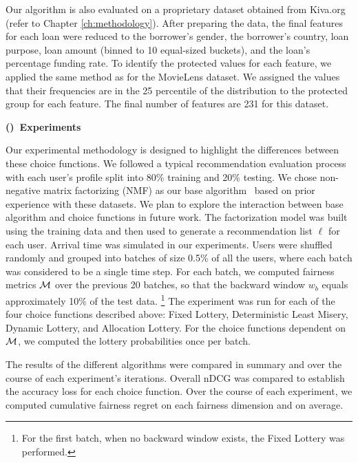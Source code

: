 Our algorithm is also evaluated on a proprietary dataset obtained from Kiva.org (refer to Chapter \ref{ch:methodology}). After preparing the data, the final features for each loan were reduced to the borrower's gender, the borrower's country, loan purpose, loan amount (binned to 10 equal-sized buckets), and the loan's percentage funding rate. To identify the protected values for each feature, we applied the same method as for the MovieLens dataset. We assigned the values that their frequencies are in the 25 percentile of the distribution to the protected group for each feature. The final number of features are 231 for this dataset.

\vspace{0.25cm}
\noindent \textbf{()~Experiments}
\vspace{0.25cm}

Our experimental methodology is designed to highlight the differences between these choice functions. We followed a typical recommendation evaluation process with each user's profile split into 80\% training and 20\% testing. We chose non-negative matrix factorizing (NMF) as our base algorithm~\cite{takacs2008investigation} based on prior experience with these datasets. We plan to explore the interaction between base algorithm and choice functions in future work. The factorization model was built using the training data and then used to generate a recommendation list $\ell$ for each user.
Arrival time was simulated in our experiments. Users were shuffled randomly and grouped into batches of size 0.5\% of all the users, where each batch was considered to be a single time step. For each batch, we computed fairness metrics $\mathcal{M}$ over the previous 20 batches, so that the backward window $w_b$ equals approximately 10\% of the test data. \footnote{For the first batch, when no backward window exists, the Fixed Lottery was performed.} The experiment was run for each of the four choice functions described above: Fixed Lottery, Deterministic Least Misery, Dynamic Lottery, and Allocation Lottery. For the choice functions dependent on $\mathcal{M}$, we computed the lottery probabilities once per batch. 

The results of the different algorithms were compared in summary and over the course of each experiment's iterations. Overall nDCG was compared to establish the accuracy loss for each choice function. Over the course of each experiment, we computed cumulative fairness regret on each fairness dimension and on average. 

